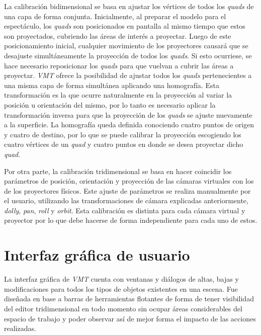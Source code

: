 La calibración bidimensional se basa en ajustar los vértices de todos los \emph{quads} de una capa de forma conjunta.
Inicialmente, al preparar el modelo para el espectáculo, los \emph{quads} son posicionados en pantalla al mismo tiempo que estos son proyectados, cubriendo las áreas de interés a proyectar. Luego de este posicionamiento inicial, cualquier movimiento de los proyectores causará que se desajuste simultáneamente la proyección de todos los \emph{quads}. Si esto ocurriese, se hace necesario reposicionar los \emph{quads} para que vuelvan a cubrir las áreas a proyectar.
\emph{VMT} ofrece la posibilidad de ajustar todos los \emph{quads} pertenecientes a una misma capa de forma simultánea aplicando una homografía. Esta transformación es la que ocurre naturalmente en la proyección al variar la posición u orientación del mismo, por lo tanto es necesario aplicar la transformación inversa para que la proyección de los \emph{quads} se ajuste nuevamente a la superficie. La homografía queda definida conociendo cuatro puntos de origen y cuatro de destino, por lo que se puede calibrar la proyección escogiendo los cuatro vértices de un \emph{quad} y cuatro puntos en donde se desea proyectar dicho \emph{quad}.

Por otra parte, la calibración tridimensional se basa en hacer coincidir los parámetros de posición, orientación y proyección de las cámaras virtuales con los de los proyectores físicos. Este ajuste de parámetros se realiza manualmente por el usuario, utilizando las transformaciones de cámara explicadas anteriormente, \emph{dolly}, \emph{pan}, \emph{roll} y \emph{orbit}. Esta calibración es distinta para cada cámara virtual y proyector por lo que debe hacerse de forma independiente para cada uno de estos.

\section{Interfaz gráfica de usuario}

La interfaz gráfica de \emph{VMT} cuenta con ventanas y diálogos de altas, bajas y modificaciones para todos los tipos de objetos existentes en una escena. Fue diseñada en base a barras de herramientas flotantes de forma de tener visibilidad del editor tridimensional en todo momento sin ocupar áreas considerables del espacio de trabajo y poder observar así de mejor forma el impacto de las acciones realizadas.

